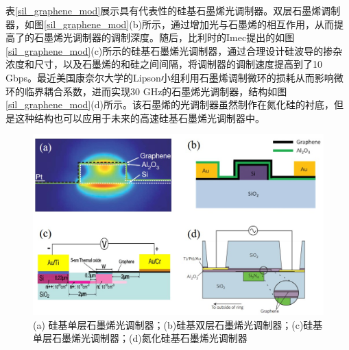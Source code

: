 表\ref{sil_graphene_mod}展示具有代表性的硅基石墨烯光调制器。双层石墨烯调制器，如图\ref{sil_graphene_mod}(b)所示，通过增加光与石墨烯的相互作用，从而提高了的石墨烯光调制器的调制深度。随后，比利时的Imec提出的如图\ref{sil_graphene_mod}(c)所示的硅基石墨烯光调制器，通过合理设计硅波导的掺杂浓度和尺寸，以及石墨烯的和硅之间间隔，将调制器的调制速度提高到了10 Gbps\cite{liu2011graphene, hu2016broadband}。最近美国康奈尔大学的Lipson小组利用石墨烯调制微环的损耗从而影响微环的临界耦合系数，进而实现30 GHz的石墨烯光调制器，结构如图\ref{sil_graphene_mod}(d)所示。该石墨烯的光调制器虽然制作在氮化硅的衬底，但是这种结构也可以应用于未来的高速硅基石墨烯光调制器中。

\begin{figure}[htb]
	\centering
	\includegraphics[width=12cm]{./Pictures/fig_graphene_mod.jpg}
	\caption{ (a) 硅基单层石墨烯光调制器\cite{liu2011graphene}；(b)硅基双层石墨烯光调制器\cite{liu2012double}；(c)硅基单层石墨烯光调制器\cite{hu2014broadband, hu2016broadband}；(d)氮化硅基石墨烯光调制器\cite{phare2015graphene}}
	\label{fig_ge_mod}
\end{figure}

